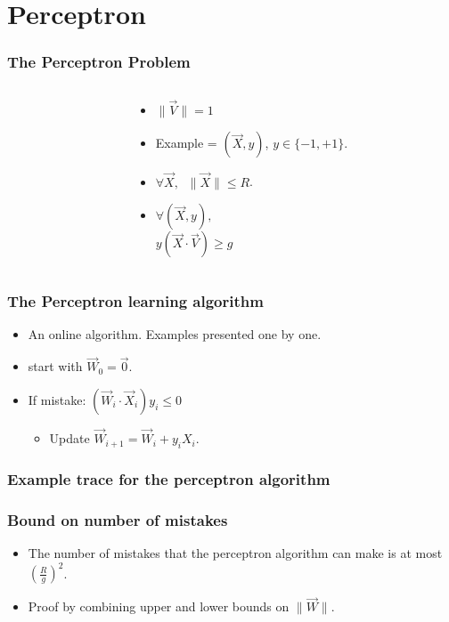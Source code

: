 \documentclass[handout]{beamer}
\newcommand{\W}{\vec{W}}
\newcommand{\V}{\vec{V}}
\newcommand{\X}{\vec{X}}
\begin{document}

\section{Perceptron}

\begin{frame}
\frametitle{The Perceptron Problem}
\begin{columns}
\begin{column}[T]{5.2cm}
\end{column}

\begin{column}[T]{4cm}
\begin{itemize}
\item
$\| \V \| =1$
\item 
Example = $(\X,y)$, $y \in \{-1,+1\}$.
\item
$\forall \X,\;\; \| \X \| \leq R$.
\item
$\forall (\X,y),$\\$y(\X \cdot \V) \geq g$
\end{itemize}
\end{column}
\end{columns}

\end{frame}

\begin{frame}
\frametitle{The Perceptron learning algorithm}
\begin{itemize}
\item An online algorithm. Examples presented one by one.
\item start with $\W_0 = \vec{0}$.
\item If mistake: $(\W_i \cdot \X_i) y_i \leq  0$
\begin{itemize}
\item Update $\W_{i+1} = \W_i + y_i X_i$.
\end{itemize}
\end{itemize}
\end{frame}

\begin{frame}
\frametitle{Example trace for the perceptron algorithm}
\end{frame}

\begin{frame}
\frametitle{Bound on number of mistakes}
\begin{itemize}
\item The number of mistakes that the perceptron algorithm can make is at most
$\left(\frac{R}{g}\right)^2$.
\item Proof by combining upper and lower bounds on $\| \W \|$.
\end{itemize}
\end{frame}
\end{document}

